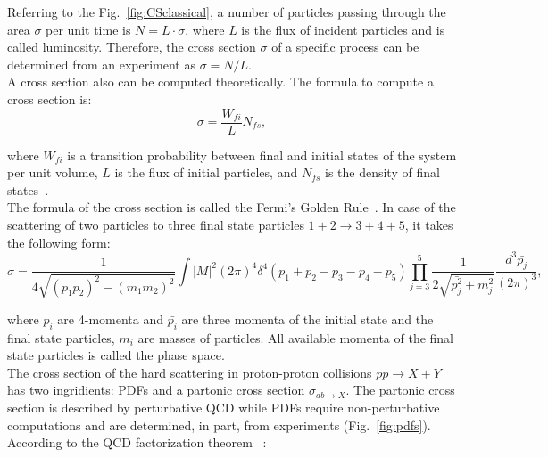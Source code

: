 Referring to the Fig.~\ref{fig:CSclassical}, a number of particles passing through the area $\sigma$ per unit time is $N=L \cdot \sigma$, where $L$ is the flux of incident particles and is called luminosity. Therefore, the cross section $\sigma$ of a specific process can be determined from an experiment as $\sigma=N/L$. \\

A cross section also can be computed theoretically. The formula to compute a cross section is:\\

\begin{equation}
  \sigma = \frac{W_{fi}}{L} N_{fs},
\end{equation}

where $W_{fi}$ is a transition probability between final and initial states of the system per unit volume, $L$ is the flux of initial particles, and $N_{fs}$ is the density of final states~\cite{ref_Halzen_Martin}.\\ 

The formula of the cross section is called the Fermi's Golden Rule~\cite{ref_Griffiths}. In case of the scattering of two particles to three final state particles $1+2\rightarrow 3+4+5$, it takes the following form:\\

\begin{equation}\label{eq:FermiGoldenRule}
  \sigma = \frac{ 1 }{4\sqrt{(p_1p_2)^2-(m_1m_2)^2}} \int |M|^2 (2\pi)^4 \delta^4(p_1+p_2-p_3-p_4-p_5) \prod_{j=3}^{5} \frac{1}{2 \sqrt{\bar{p_j^2}+m_j^2 }}\frac{d^3\bar{p_j}}{(2\pi)^3},  
\end{equation}

where $p_i$ are 4-momenta and ${\bar{p_i}}$ are three momenta of the initial state and the final state particles, $m_i$ are masses of particles. All available momenta of the final state particles is called the phase space.\\ 

The cross section of the hard scattering in proton-proton collisions $pp \rightarrow X+Y$ has two ingridients: PDFs and a partonic cross section $\sigma_{ab\rightarrow X}$. The partonic cross section is described by perturbative QCD while PDFs require non-perturbative computations and are determined, in part, from experiments (Fig.~\ref{fig:pdfs}). According to the QCD factorization theorem ~\cite{ref_HardScattering}:\\


